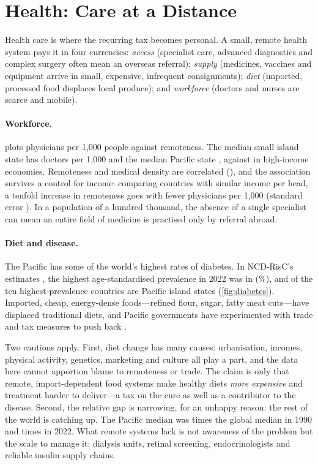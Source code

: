 \section{Health: Care at a Distance}
\label{sec:health}

Health care is where the recurring tax becomes personal. A small, remote
health system pays it in four currencies: \emph{access} (specialist care,
advanced diagnostics and complex surgery often mean an overseas referral);
\emph{supply} (medicines, vaccines and equipment arrive in small, expensive,
infrequent consignments); \emph{diet} (imported, processed food displaces
local produce); and \emph{workforce} (doctors and nurses are scarce and
mobile).

\paragraph{Workforce.}  plots physicians per 1,000 people
against remoteness. The median small island state has \docSIDSMedian{}
doctors per 1,000 and the median Pacific state \docPacificMedian, against
\docHICMedian{} in high-income economies. Remoteness and medical density are
correlated (\corrDocRemote), and the association survives a control for
income: comparing countries with similar income per head, a tenfold increase
in remoteness goes with \docRemoteCoef{} fewer physicians per 1,000 (standard
error \docRemoteSE). In a population of a hundred thousand, the absence of a
single specialist can mean an entire field of medicine is practised only by
referral abroad.



\paragraph{Diet and disease.} The Pacific has some of the world's highest
rates of diabetes. In NCD-RisC's estimates \parencite{ncdrisc2024}, the
highest age-standardised prevalence in 2022 was in \diabTopName{}
(\diabTopValue\%), and \diabTopTenPacific{} of the ten highest-prevalence
countries are Pacific island states (\cref{fig:diabetes}). Imported, cheap,
energy-dense foods---refined flour, sugar, fatty meat cuts---have displaced
traditional diets, and Pacific governments have experimented with trade and
tax measures to push back \parencite{snowdon2013}.



Two cautions apply. First, diet change has many causes: urbanisation,
incomes, physical activity, genetics, marketing and culture all play a part,
and the data here cannot apportion blame to remoteness or trade. The claim
is only that remote, import-dependent food systems make healthy diets
\emph{more expensive} and treatment harder to deliver---a tax on the cure as
well as a contributor to the disease. Second, the relative gap is narrowing,
for an unhappy reason: the rest of the world is catching up. The Pacific
median was \diabPacificRatioNinety{} times the global median in 1990 and
\diabPacificRatioNow{} times in 2022. What remote systems lack is not
awareness of the problem but the scale to manage it: dialysis units, retinal
screening, endocrinologists and reliable insulin supply chains.
